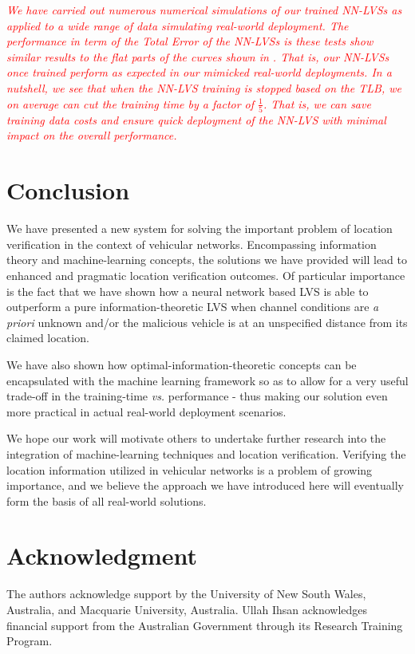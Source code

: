 \documentclass[journal]{IEEEtran}
\begin{document}
\textcolor{red}{\textit{We have carried out numerous numerical simulations of our trained NN-LVSs as applied to a wide range of data simulating real-world deployment.  The performance in term of the Total Error of the NN-LVSs is these tests show similar results to the flat parts of the curves shown in . That is, our NN-LVSs once trained perform as expected in our mimicked real-world deployments. In a nutshell, we see that when the NN-LVS training is stopped based on the TLB, we on average can cut the training time by a factor of $\frac{1}{5}$. That is, we can save training data costs and ensure quick deployment of the NN-LVS with minimal impact on the overall performance.}}

\section{Conclusion}
We have presented a new system for solving the important problem of location verification in the context of vehicular networks. Encompassing information theory and machine-learning concepts, the solutions we have provided will lead to enhanced and pragmatic location verification outcomes. Of particular importance is the fact that we have shown how a neural network based LVS is able to outperform a pure information-theoretic LVS when channel conditions are \emph{a priori} unknown and/or the malicious vehicle is at an unspecified distance from its claimed location.

We have also shown how optimal-information-theoretic concepts can be encapsulated with the machine learning framework so as to  allow for a very  useful trade-off in the training-time \emph{vs.} performance - thus making our solution even more practical in actual real-world deployment scenarios.

We hope our work will motivate others to undertake further research into the integration of machine-learning techniques and location verification. Verifying the location information utilized in vehicular networks is a problem of growing importance, and we believe the approach we have introduced here will eventually form the basis of all real-world solutions.

\section*{Acknowledgment}
The authors acknowledge support by the University of New South Wales, Australia, and Macquarie University, Australia. Ullah Ihsan acknowledges financial support from the Australian Government through its Research Training Program.
\end{document}
